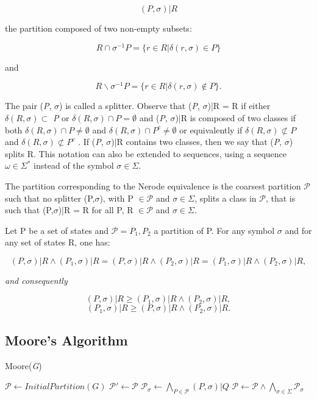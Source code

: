 {\[
(P, \sigma)|R
\]

\noindent the partition composed of two non-empty subsets:

\[
R\cap\sigma^{-1}P = \{r \in R | \delta(r,\sigma) \in P\}
\]

\noindent and

\[
R\backslash\sigma^{-1}P = \{r \in R | \delta(r,\sigma) \notin P\}.
\]

The pair (\textit{P}, $\sigma$) is called a splitter. Observe that (\textit{P}, $\sigma$)|R = {R} if either $\delta(R,\sigma) \subset$ \textit{P}
or $\delta(R,\sigma)\cap P = \emptyset$ and (\textit{P}, $\sigma$)|R is composed of two classes if both $\delta(R,\sigma)\cap P  \neq\emptyset$ and
$\delta(R,\sigma)\cap P^c  \neq \emptyset$  or equivalently if $\delta(R,\sigma) \not\subset P $   and  $\delta(R,\sigma)\not\subset P^c $ . If (\textit{P}, $\sigma$)|R  contains two
classes, then we say that (\textit{P}, $\sigma$) splits R. This notation can also be extended to sequences, using a sequence $\omega \in \Sigma^*$ instead of the symbol $\sigma \in \Sigma$.

\begin{proposition}\label{prop:nerequiv}
The partition corresponding to the Nerode equivalence is the coarsest partition $\mathcal{P}$ such that no splitter (P,$\sigma$), with P $\in \mathcal{P}$ and $\sigma \in \Sigma$, splits a class in $\mathcal{P}$, that is such that (P,$\sigma$)|R = {R} for all P, R $\in \mathcal{P}$ and $\sigma \in \Sigma$.
\end{proposition}

\begin{lemma}\label{lemm:hopcrof}
Let P be a set of states and $\mathcal{P} = {P_1, P_2}$ a partition of P. For any symbol $\sigma$ and for any set of states R, one has:
\end{lemma}
 

\[
(P,\sigma)|R \wedge (P_1, \sigma)|R = (P, \sigma)|R \wedge (P_2, \sigma)|R = (P_1,\sigma)|R \wedge (P_2,\sigma)|R,
\]

\textit{and consequently}

\[
(P,\sigma)|R \geqslant (P_1,\sigma)|R \wedge (P_2,\sigma)|R,
\]
\[
(P_1,\sigma)|R \geqslant (P,\sigma)|R \wedge (P_2,\sigma)|R.
\]
\subsection{Moore's Algorithm}

\begin{algorithm} 
  \caption{Moore(\textit{G})\label{alg:moore}}
    \begin{algorithmic}[1]
      \State $\mathcal{P} \leftarrow InitialPartition(G)$
      \Repeat
      	\State $\mathcal{P}' \leftarrow \mathcal{P}$
      	\ForAll{$\sigma \in \Sigma$}
      		\State $\mathcal{P}_{\sigma} \leftarrow \bigwedge_{P\in \mathcal{P}}(P,\sigma)|Q$
      	\EndFor
      	\State $\mathcal{P} \leftarrow \mathcal{P}\wedge\bigwedge_{\sigma\in\Sigma}\mathcal{P}_{\sigma}$
    \end{algorithmic}
  \end{algorithm}


}
